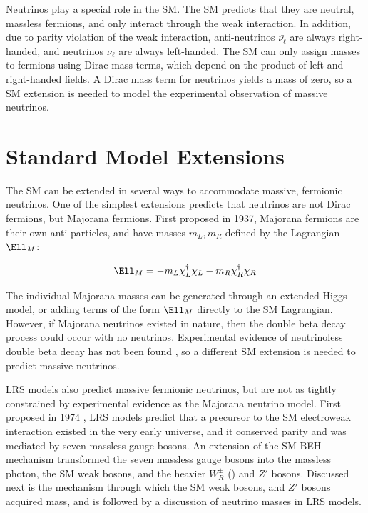Neutrinos play a special role in the SM.  The SM predicts that they are neutral, massless fermions, and only interact 
through the weak interaction.  In addition, due to parity violation of the weak interaction, 
anti-neutrinos $\bar{\nu_{\ell}}$ are always right-handed, and neutrinos $\nu_{\ell}$ are always left-handed.  
The SM can only assign masses to fermions using Dirac mass terms, which depend on the product of left and 
right-handed fields.  A Dirac mass term for neutrinos yields a mass of zero, so a SM extension is needed 
to model the experimental observation of massive neutrinos.


\section{Standard Model Extensions}
\label{sec:lrsExtensions}
The SM can be extended in several ways to accommodate massive, fermionic neutrinos.  One of the simplest 
extensions predicts that neutrinos are not Dirac fermions, but Majorana fermions.  First proposed\cite{majoranaTheory} 
in 1937, Majorana fermions are their own anti-particles, and have masses $m_{L},m_{R}$ defined by the 
Lagrangian $\Ell_{M}$:

\begin{equation}
	\Ell_{M} = -m_{L}\chi^{\dagger}_{L}\chi_{L} - m_{R}\chi^{\dagger}_{R}\chi_{R}
\end{equation}

The individual Majorana masses can be generated through an extended Higgs model, or adding terms of the 
form $\Ell_{M}$ directly to the SM Lagrangian.  However, if Majorana neutrinos existed in nature, then 
the double beta decay process could occur with no neutrinos.  Experimental evidence of neutrinoless double 
beta decay has not been found \cite{igexDblBetaDecay,gerdaDblBetaDecay}, so a different SM extension is 
needed to predict massive neutrinos.

LRS models also predict massive fermionic neutrinos, but are not as tightly constrained by experimental 
evidence as the Majorana neutrino model.
First proposed in 1974 \cite{earlyLRSModel}, LRS models predict that a precursor to the SM electroweak 
interaction existed in the very early universe, and it conserved parity and was mediated by seven massless 
gauge bosons.  An extension of the SM BEH mechanism transformed the seven massless gauge bosons 
into the massless photon, the SM weak bosons, and the heavier $W^{\pm}_{R}$ (\WR) and $Z'$ bosons.  
Discussed next is the mechanism through which the SM weak bosons, \WR and $Z'$ bosons acquired mass, 
and is followed by a discussion of neutrino masses in LRS models.

